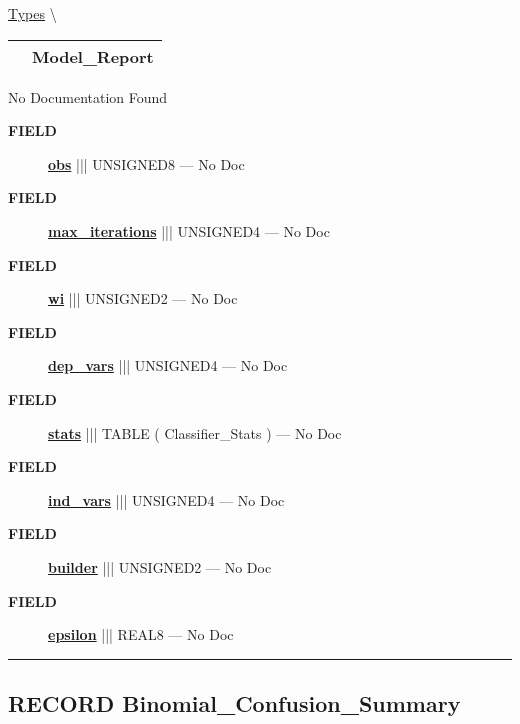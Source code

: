 \hypertarget{ecldoc:logisticregression.types.model_report}{}
\hspace{0pt} \hyperlink{ecldoc:LogisticRegression.Types}{Types} \textbackslash 

{\renewcommand{\arraystretch}{1.5}
\begin{tabularx}{\textwidth}{|>{\raggedright\arraybackslash}l|X|}
\hline
\hspace{0pt}\mytexttt{\color{red} } & \textbf{Model\_Report} \\
\hline
\end{tabularx}
}

\par





No Documentation Found







\par
\begin{description}
\item [\colorbox{tagtype}{\color{white} \textbf{\textsf{FIELD}}}] \textbf{\underline{obs}} ||| UNSIGNED8 --- No Doc
\item [\colorbox{tagtype}{\color{white} \textbf{\textsf{FIELD}}}] \textbf{\underline{max\_iterations}} ||| UNSIGNED4 --- No Doc
\item [\colorbox{tagtype}{\color{white} \textbf{\textsf{FIELD}}}] \textbf{\underline{wi}} ||| UNSIGNED2 --- No Doc
\item [\colorbox{tagtype}{\color{white} \textbf{\textsf{FIELD}}}] \textbf{\underline{dep\_vars}} ||| UNSIGNED4 --- No Doc
\item [\colorbox{tagtype}{\color{white} \textbf{\textsf{FIELD}}}] \textbf{\underline{stats}} ||| TABLE ( Classifier\_Stats ) --- No Doc
\item [\colorbox{tagtype}{\color{white} \textbf{\textsf{FIELD}}}] \textbf{\underline{ind\_vars}} ||| UNSIGNED4 --- No Doc
\item [\colorbox{tagtype}{\color{white} \textbf{\textsf{FIELD}}}] \textbf{\underline{builder}} ||| UNSIGNED2 --- No Doc
\item [\colorbox{tagtype}{\color{white} \textbf{\textsf{FIELD}}}] \textbf{\underline{epsilon}} ||| REAL8 --- No Doc
\end{description}





\rule{\linewidth}{0.5pt}
\subsection*{\textsf{\colorbox{headtoc}{\color{white} RECORD}
Binomial\_Confusion\_Summary}}

